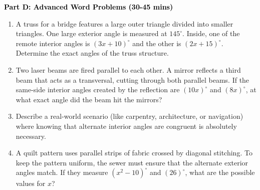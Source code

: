 \documentclass[12pt, letterpaper, fleqn]{article}
\begin{document}
\newpage

\begin{tcolorbox}[colback=customteal!20]
\large\textcolor{black}{\textbf{Part D: Advanced Word Problems (30-45 mins)}}
\end{tcolorbox}

\vspace{3mm}

\begin{enumerate}[itemsep=5.5cm, leftmargin=0.6cm, resume]
\item A truss for a bridge features a large outer triangle divided into smaller triangles. One large exterior angle is measured at $145^\circ$. Inside, one of the remote interior angles is $(3x + 10)^\circ$ and the other is $(2x + 15)^\circ$. Determine the exact angles of the truss structure.
\item Two laser beams are fired parallel to each other. A mirror reflects a third beam that acts as a transversal, cutting through both parallel beams. If the same-side interior angles created by the reflection are $(10x)^\circ$ and $(8x)^\circ$, at what exact angle did the beam hit the mirrors?
\item Describe a real-world scenario (like carpentry, architecture, or navigation) where knowing that alternate interior angles are congruent is absolutely necessary.
\item A quilt pattern uses parallel strips of fabric crossed by diagonal stitching. To keep the pattern uniform, the sewer must ensure that the alternate exterior angles match. If they measure $(x^2 - 10)^\circ$ and $(26)^\circ$, what are the possible values for $x$?
\end{enumerate}
\end{document}
